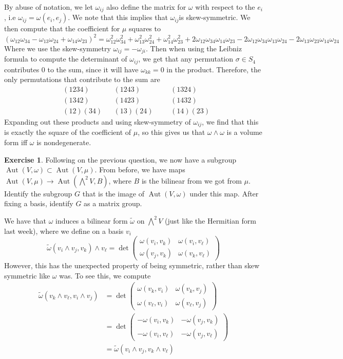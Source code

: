 \documentclass[psamsfonts]{amsart}
\theoremstyle{definition}
\newtheorem{exer}[thm]{Exercise}
\theoremstyle{remark}
\DeclareMathOperator{\Aut}{Aut}
\begin{document}
By abuse of notation, we let $\omega_{ij}$ also define the matrix for $\omega$ with respect to the $e_i$, i.e $\omega_{ij} = \omega(e_i,e_j)$. We note that this implies that $\omega_{ij}$is skew-symmetric. We then compute that the coefficient for $\mu$ squares to
$$(\omega_{12}\omega_{34} - \omega_{13}\omega_{24} + \omega_{14}\omega_{23})^2 = \omega_{12}^2\omega_{34}^2 + \omega_{13}^2\omega_{24}^2 + \omega_{14}^2\omega_{23}^2 + 2\omega_{12}\omega_{34}\omega_{14}\omega_{23} - 2\omega_{12}\omega_{34}\omega_{13}\omega_{24} - 2\omega_{13}\omega_{23}\omega_{14}\omega_{24}$$
Where we use the skew-symmetry $\omega_{ij} = - \omega_{ji}$. Then when using the Leibniz formula to compute the determinant of $\omega_{ij}$, we get that any permutation $\sigma \in S_4$ contributes $0$ to the sum, since it will have $\omega_{kk} = 0$ in the product. Therefore, the only permutations that contribute to the sum are
\begin{align*}
&(1234) &&(1243) &&&(1324) \\
&(1342) &&(1423) &&&(1432) \\
&(12)(34) &&(13)(24) &&&(14)(23) 
\end{align*}
Expanding out these products and using skew-symmetry of $\omega_{ij}$, we find that this is exactly the square of the coefficient of $\mu$, so this gives us that $\omega \wedge \omega$ is a volume form iff $\omega$ is nondegenerate.
%
\begin{exer}
Following on the previous question, we now have a subgroup $\Aut(V, \omega) \subset \Aut(V, \mu)$. From before, we have maps $\Aut(V, \mu) \to \Aut(\bigwedge^2V, B)$, where $B$ is the bilinear from we got from $\mu$. Identify the subgroup $G$ that is the image of $\Aut(V, \omega)$ under this map. After fixing a basis, identify $G$ as a matrix group.
\end{exer}
We have that $\omega$ induces a bilinear form $\tilde{\omega}$ on $\bigwedge^2V$ (just like the Hermitian form last week), where we define on a basis $v_i$ 
$$\tilde{\omega}(v_i \wedge v_j, v_k) \wedge v_\ell = \det\begin{pmatrix}
\omega(v_i,v_k) & \omega(v_i,v_\ell) \\
\omega(v_j,v_k) & \omega(v_k, v_\ell)
\end{pmatrix} $$
However, this has the unexpected property of being symmetric, rather than skew symmetric like $\omega$ was. To see this, we compute
\begin{align*}
\tilde{\omega}(v_k \wedge v_\ell, v_i \wedge v_j) &= \det\begin{pmatrix}
\omega(v_k, v_i) & \omega(v_k, v_j) \\
\omega(v_\ell, v_i) & \omega(v_\ell, v_j)
\end{pmatrix} \\[5pt]
&= \det\begin{pmatrix}
-\omega(v_i, v_k) & -\omega(v_j, v_k) \\
-\omega(v_i, v_\ell) & -\omega(v_j, v_\ell)
\end{pmatrix} \\[5pt]
&= \tilde{\omega}(v_i \wedge v_j, v_k \wedge v_\ell)
\end{align*}
\end{document}
